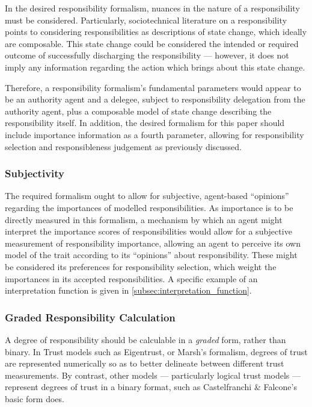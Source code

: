 In the desired responsibility formalism, nuances in the nature of a responsibility must be considered. Particularly, sociotechnical literature on a responsibility points to considering responsibilities as descriptions of state change, which ideally are composable. This state change could be considered the intended or required outcome of successfully discharging the responsibility --- however, it does not imply any information regarding the action which brings about this state change.\par

Therefore, a responsibility formalism's fundamental parameters would appear to be an authority agent and a delegee, subject to responsibility delegation from the authority agent, plus a composable model of state change describing the responsibility itself. In addition, the desired formalism for this paper should include importance information as a fourth parameter, allowing for responsibility selection and responsibleness judgement as previously discussed.\par

\subsubsection{Subjectivity}
The required formalism ought to allow for subjective, agent-based ``opinions'' regarding the importances of modelled responsibilities. As importance is to be directly measured in this formalism, a mechanism by which an agent might interpret the importance scores of responsibilities would allow for a subjective measurement of responsibility importance, allowing an agent to perceive its own model of the trait according to its ``opinions'' about responsibility. These might be considered its preferences for responsibility selection, which weight the importances in its accepted responsibilities. A specific example of an interpretation function is given in \cref{subsec:interpretation_function}.\par

\subsubsection{Graded Responsibility Calculation}
A degree of responsibility should be calculable in a \emph{graded} form, rather than binary. In Trust models such as Eigentrust, or Marsh's formalism, degrees of trust are represented numerically so as to better delineate between different trust measurements. By contrast, other models --- particularly logical trust models --- represent degrees of trust in a binary format, such as Castelfranchi \& Falcone's basic form does.\par

